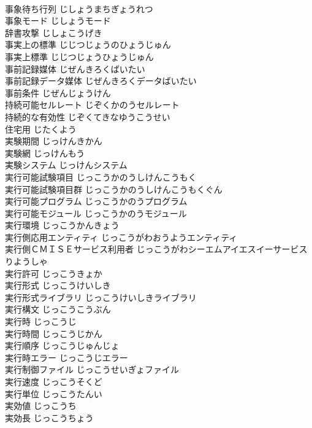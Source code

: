 \documentclass[8pt]{extreport}
\begin{document}
\begin{CJK}{UTF8}{min}
\\	事象待ち行列	じしょうまちぎょうれつ	
\\	事象モード	じしょうモード	
\\	辞書攻撃	じしょこうげき	
\\	事実上の標準	じじつじょうのひょうじゅん	
\\	事実上標準	じじつじょうひょうじゅん	
\\	事前記録媒体	じぜんきろくばいたい	
\\	事前記録データ媒体	じぜんきろくデータばいたい	
\\	事前条件	じぜんじょうけん	
\\	持続可能セルレート	じぞくかのうセルレート	
\\	持続的な有効性	じぞくてきなゆうこうせい	
\\	住宅用	じたくよう	
\\	実験期間	じっけんきかん	
\\	実験網	じっけんもう	
\\	実験システム	じっけんシステム	
\\	実行可能試験項目	じっこうかのうしけんこうもく	
\\	実行可能試験項目群	じっこうかのうしけんこうもくぐん	
\\	実行可能プログラム	じっこうかのうプログラム	
\\	実行可能モジュール	じっこうかのうモジュール	
\\	実行環境	じっこうかんきょう	
\\	実行側応用エンティティ	じっこうがわおうようエンティティ	
\\	実行側ＣＭＩＳＥサービス利用者	じっこうがわシーエムアイエスイーサービスりようしゃ	
\\	実行許可	じっこうきょか	
\\	実行形式	じっこうけいしき	
\\	実行形式ライブラリ	じっこうけいしきライブラリ	
\\	実行構文	じっこうこうぶん	
\\	実行時	じっこうじ	
\\	実行時間	じっこうじかん	
\\	実行順序	じっこうじゅんじょ	
\\	実行時エラー	じっこうじエラー	
\\	実行制御ファイル	じっこうせいぎょファイル	
\\	実行速度	じっこうそくど	
\\	実行単位	じっこうたんい	
\\	実効値	じっこうち	
\\	実効長	じっこうちょう	

\end{CJK}
\end{document}
